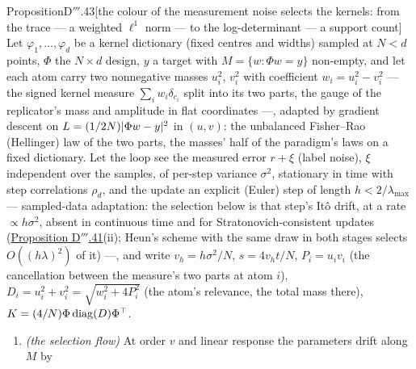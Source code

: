 \begin{thm}{Proposition}{D$'''$.43}[the colour of the measurement noise selects the kernels: from the trace --- a
weighted $\ell^1$ norm --- to the log-determinant --- a support count]\label{res:thmDppp:43}%
Let $\varphi_1,\dots,\varphi_d$ be a kernel dictionary (fixed centres and widths) sampled at $N < d$ points, $\Phi$ the
$N\times d$ design, $y$ a target with $M = \{w : \Phi w = y\}$ non-empty, and let each atom carry two nonnegative masses
$u_i^2$, $v_i^2$ with coefficient $w_i = u_i^2 - v_i^2$ --- the signed kernel measure $\sum_iw_i\delta_{c_i}$ split into
its two parts, the gauge of the replicator's mass and amplitude in flat coordinates ---, adapted by gradient descent on
$L = (1/2N)\lvert \Phi w - y\rvert^2$ in $(u,v)$: the unbalanced Fisher--Rao (Hellinger) law of the two parts, the masses' half
of the paradigm's laws on a fixed dictionary. Let the loop see the measured error $r + \xi$ (label noise), $\xi$
independent over the samples, of per-step variance $\sigma^2$, stationary in time with step correlations $\rho_d$, and
the update an explicit (Euler) step of length $h < 2/\lambda_{\max}$ --- sampled-data adaptation: the selection below is
that step's It\^o drift, at a rate $\propto h\sigma^2$, absent in continuous time and for Stratonovich-consistent updates
(\hyperref[res:thmDppp:41]{Proposition D$'''$.41}(ii); Heun's scheme with the same draw in both stages selects
$O((h\lambda)^2)$ of it) ---, and write $v_h = h\sigma^2/N$, $s = 4v_ht/N$, $P_i = u_iv_i$ (the cancellation between the
measure's two parts at atom $i$), $D_i = u_i^2 + v_i^2 = \sqrt{w_i^2 + 4P_i^2}$ (the atom's relevance, the total mass
there), $K = (4/N)\Phi\operatorname{diag}(D)\Phi^\top$.
\begin{enumerate}[label=\textup{(\roman*)}]
  \item \emph{(the selection flow)} At order $v$ and linear response the parameters drift along $M$ by

\end{enumerate}
\end{thm}
